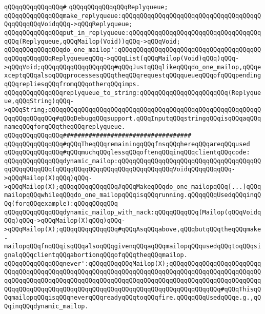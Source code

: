 \verb|qQQqqQQqqQQqqQQq#|\newline
\verb|qQQqqQQqqQQqqQQqReplyqueue;|\newline
\verb|qQQqqQQqqQQqqQQqmake_replyqueue:qQQqqQQqqQQqqQQqqQQqqQQqqQQqqQQqqQQqqQQqqQQqqQQqVoidqQQq->qQQqReplyqueue;|\newline
\verb|qQQqqQQqqQQqqQQqput_in_replyqueue:qQQqqQQqqQQqqQQqqQQqqQQqqQQqqQQqqQQqqQQq(Replyqueue,qQQqMailop(Void))qQQq->qQQqVoid;|\newline
\verb|qQQqqQQqqQQqqQQqdo_one_mailop':qQQqqQQqqQQqqQQqqQQqqQQqqQQqqQQqqQQqqQQqqQQqqQQqqQQqReplyqueueqQQq->qQQqList(qQQqMailop(Void)qQQq)qQQq->qQQqVoid;qQQqqQQqqQQqqQQqqQQq#qQQqJustqQQqlikeqQQqdo_one_mailop,qQQqexceptqQQqalsoqQQqprocessesqQQqtheqQQqrequestqQQqqueueqQQqofqQQqpendingqQQqrepliesqQQqfromqQQqotherqQQqimps.|\newline
\verb|qQQqqQQqqQQqqQQqreplyqueue_to_string:qQQqqQQqqQQqqQQqqQQqqQQq(Replyqueue,qQQqString)qQQq->qQQqString;qQQqqQQqqQQqqQQqqQQqqQQqqQQqqQQqqQQqqQQqqQQqqQQqqQQqqQQqqQQqqQQqqQQqqQQq#qQQqDebugqQQqsupport.qQQqInputqQQqstringqQQqisqQQqaqQQqnameqQQqforqQQqtheqQQqreplyqueue.|\newline
\newline
\newline
\newline
\verb|qQQqqQQqqQQqqQQq###################################|\newline
\verb|qQQqqQQqqQQqqQQq#qQQqTheqQQqremainingqQQqfnsqQQqhereqQQqareqQQqused|\newline
\verb|qQQqqQQqqQQqqQQq#qQQqmuchqQQqlessqQQqoftenqQQqinqQQqclientqQQqcode:|\newline
\newline
\verb|qQQqqQQqqQQqqQQqdynamic_mailop:qQQqqQQqqQQqqQQqqQQqqQQqqQQqqQQqqQQqqQQqqQQqqQQqqQQq(qQQqqQQqqQQqqQQqqQQqqQQqqQQqqQQqVoidqQQqqQQqqQQq->qQQqMailop(X)qQQq)qQQq->qQQqMailop(X);qQQqqQQqqQQqqQQq#qQQqMakeqQQqdo_one_mailopqQQq[...]qQQqmailopqQQqwhileqQQqdo_one_mailopqQQqisqQQqrunning.qQQqqQQqUsedqQQqinqQQq(forqQQqexample):qQQqqQQqqQQq|\newline
\verb|qQQqqQQqqQQqqQQqdynamic_mailop_with_nack:qQQqqQQqqQQq(Mailop(qQQqVoidqQQq)qQQq->qQQqMailop(X)qQQq)qQQq->qQQqMailop(X);qQQqqQQqqQQqqQQq#qQQqAsqQQqabove,qQQqbutqQQqtheqQQqmake-mailopqQQqfnqQQqisqQQqalsoqQQqgivenqQQqaqQQqmailopqQQqusedqQQqtoqQQqsignalqQQqclientqQQqabortionqQQqofqQQqtheqQQqmailop.|\newline
\newline
\verb|qQQqqQQqqQQqqQQqnever':qQQqqQQqqQQqMailop(X);qQQqqQQqqQQqqQQqqQQqqQQqqQQqqQQqqQQqqQQqqQQqqQQqqQQqqQQqqQQqqQQqqQQqqQQqqQQqqQQqqQQqqQQqqQQqqQQqqQQqqQQqqQQqqQQqqQQqqQQqqQQqqQQqqQQqqQQqqQQqqQQqqQQqqQQqqQQqqQQqqQQqqQQqqQQqqQQqqQQqqQQqqQQqqQQqqQQqqQQqqQQqqQQqqQQqqQQqqQQqqQQq#qQQqThisqQQqmailopqQQqisqQQqneverqQQqreadyqQQqtoqQQqfire.qQQqqQQqUsedqQQqe.g.,qQQqinqQQqdynamic_mailop.|\newline
